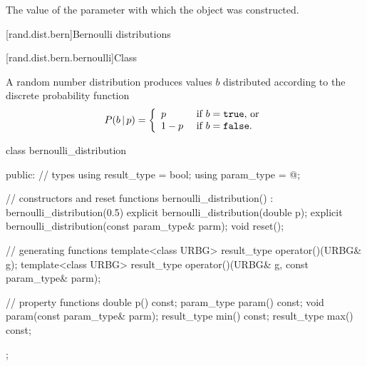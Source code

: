 \begin{itemdescr}
\pnum\returns The value of the  parameter
 with which the object was constructed.
\end{itemdescr}%
%



[rand.dist.bern]{Bernoulli distributions}%
%
%


[rand.dist.bern.bernoulli]{Class }%
%
%

\pnum
A  random number distribution
produces  values $b$
distributed according to
the discrete probability function
%
%
\[  P(b\,|\,p) = \left\{ \begin{array}{ll}
                          p     & \text{ if $b = \texttt{true}$, or} \\
                          1 - p & \text{ if $b = \texttt{false}$.}
                          \end{array}\right.
\]

%
\begin{codeblock}
class bernoulli_distribution {
public:
  // types
  using result_type = bool;
  using param_type  = @\unspec@;

  // constructors and reset functions
  bernoulli_distribution() : bernoulli_distribution(0.5) {}
  explicit bernoulli_distribution(double p);
  explicit bernoulli_distribution(const param_type& parm);
  void reset();

  // generating functions
  template<class URBG>
    result_type operator()(URBG& g);
  template<class URBG>
    result_type operator()(URBG& g, const param_type& parm);

  // property functions
  double p() const;
  param_type param() const;
  void param(const param_type& parm);
  result_type min() const;
  result_type max() const;
};
\end{codeblock}



